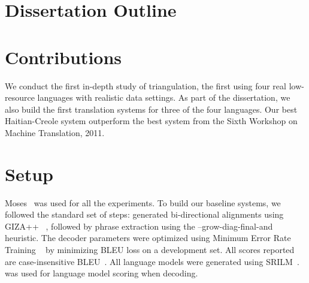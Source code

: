 \section{Dissertation Outline}
\label{sec:outline}


\section{Contributions}
\label{sec:summary}
We conduct the first in-depth study of triangulation, the first using four real low-resource languages with realistic data settings. As part of the dissertation, we also build the first translation systems for three of the four languages. Our best Haitian-Creole system outperform the best system from the Sixth Workshop on Machine Translation, 2011. 


\section{Setup}
\label{sec:setup}


Moses~\cite{Koehn:07} was used for all the experiments. To build our baseline systems, we followed the standard set of steps: generated bi-directional alignments using GIZA++ ~\cite{OchNey:03}, followed by phrase extraction using the --grow-diag-final-and heuristic. The decoder parameters were optimized using Minimum Error Rate Training ~\cite{Och:03} by minimizing BLEU loss on a development set. All scores reported are case-insensitive BLEU~\cite{Papineni:02}. All language models were generated using SRILM~\cite{Stolcke:02}.~\cite{Ken:11} was used for language model scoring when decoding.